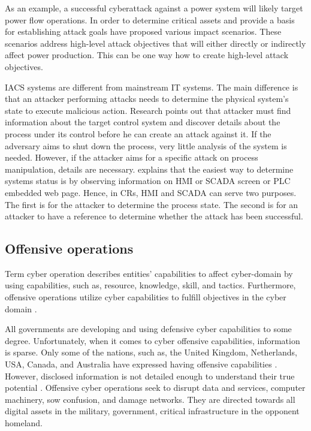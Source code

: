 As an example, a successful cyberattack against a power system will likely target power flow operations. In order to determine critical assets and provide a basis for establishing attack goals \citeauthor{36-SCADA-testbeds-2010} \parencite{36-SCADA-testbeds-2010} have proposed various impact scenarios. These scenarios address high-level attack objectives that will either directly or indirectly affect power production. This can be one way how to create high-level attack objectives.



IACS systems are different from mainstream IT systems. The main difference is that an attacker performing attacks needs to determine the physical system's state to execute malicious action. Research \parencite{44-idaho-scada-testlab.pdf} points out that attacker must find information about the target control system and discover details about the process under its control before he can create an attack against it. If the adversary aims to shut down the process, very little analysis of the system is needed. However, if the attacker aims for a specific attack on process manipulation, details are necessary. \citeauthor{48-red-tee-ics-testbed} \parencite{48-red-tee-ics-testbed} explains that the easiest way to determine systems status is by observing information on HMI or SCADA screen or PLC embedded web page. Hence, in CRs, HMI and SCADA can serve two purposes. The first is for the attacker to determine the process state. The second is for an attacker to have a reference to determine whether the attack has been successful.

\subsection{Offensive operations} \label{subsec:offensive-ops}

Term cyber operation describes entities' capabilities to affect cyber-domain by using capabilities, such as, resource, knowledge, skill, and tactics. Furthermore, offensive operations utilize cyber capabilities to fulfill objectives in the cyber domain \parencite{94-nation-offensive-capabilities-ccdco}.

All governments are developing and using defensive cyber capabilities to some degree. Unfortunately, when it comes to cyber offensive capabilities, information is sparse. Only some of the nations, such as, the United Kingdom, Netherlands, USA, Canada, and Australia have expressed having offensive capabilities \parencite{94-nation-offensive-capabilities-ccdco, 91-netherlands-cyber-ofensive-capabiliteis, 92-UK-cyber-offensive}. However, disclosed information is not detailed enough to understand their true potential \parencite{71-ccdcoe-modeling-national-state-offensive-capabilities}. Offensive cyber operations seek to disrupt data and services, computer machinery, sow confusion, and damage networks. They are directed towards all digital assets in the military, government, critical infrastructure in the opponent homeland.

